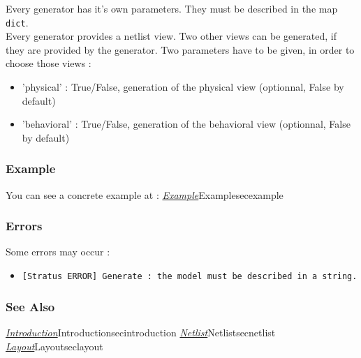 Every generator has it's own parameters. They must be described in the map \verb-dict-.\\
\indent Every generator provides a netlist view. Two other views can be generated, if they are provided by the generator. Two parameters have to be given, in order to choose those views :  
\begin{itemize}
    \item 'physical' : True/False, generation of the physical view (optionnal, False by default)
    \item 'behavioral' : True/False, generation of the behavioral view (optionnal, False by default)
\end{itemize}

\begin{htmlonly}

\subsubsection{Example}

You can see a concrete example at : \hyperref[ref]{\emph{Example}}{}{Example}{secexample}

\end{htmlonly}

\subsubsection{Errors}
    
Some errors may occur :
\begin{itemize}
    \item \verb-[Stratus ERROR] Generate : the model must be described in a string.-
\end{itemize}

\begin{htmlonly}

\subsubsection{See Also}

\hyperref[ref]{\emph{Introduction}}{}{Introduction}{secintroduction}
\hyperref[ref]{\emph{Netlist}}{}{Netlist}{secnetlist}
\hyperref[ref]{\emph{Layout}}{}{Layout}{seclayout}

\end{htmlonly}
